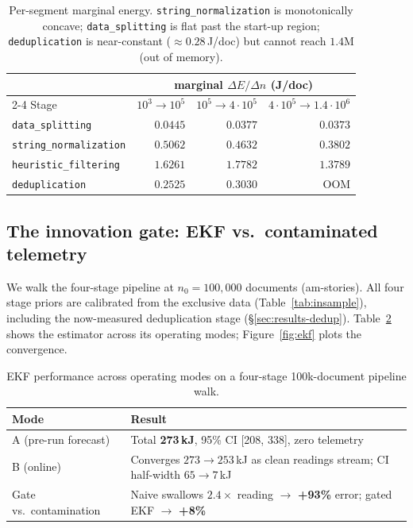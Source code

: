 \documentclass{article}
\begin{document}
\begin{table}[ht]
  \centering
  \begin{tabular}{lrrr}
    \toprule
    & \multicolumn{3}{c}{marginal $\Delta E/\Delta n$ (J/doc)} \\
    \cmidrule(lr){2-4}
    Stage & $10^3{\to}10^5$ & $10^5{\to}4{\cdot}10^5$ & $4{\cdot}10^5{\to}1.4{\cdot}10^6$ \\
    \midrule
    \texttt{data\_splitting}        & $0.0445$ & $0.0377$ & $0.0373$ \\
    \texttt{string\_normalization}  & $0.5062$ & $0.4632$ & $0.3802$ \\
    \texttt{heuristic\_filtering}   & $1.6261$ & $1.7782$ & $1.3789$ \\
    \texttt{deduplication}          & $0.2525$ & $0.3030$ & OOM \\
    \bottomrule
  \end{tabular}
  \caption{Per-segment marginal energy. \texttt{string\_normalization} is monotonically concave; \texttt{data\_splitting} is flat past the start-up region; \texttt{deduplication} is near-constant ($\approx 0.28$\,J/doc) but cannot reach $1.4$M (out of memory).}
  \label{tab:marginal}
\end{table}

\subsection{The innovation gate: EKF vs.\ contaminated telemetry}

\label{sec:results-ekf}

We walk the four-stage pipeline at $n_0 = 100{,}000$ documents (am-stories). All four stage priors are calibrated from the exclusive data (Table~\ref{tab:insample}), including the now-measured deduplication stage (\S\ref{sec:results-dedup}). Table~\ref{tab:ekf} shows the estimator across its operating modes; Figure~\ref{fig:ekf} plots the convergence.

\begin{table}[ht]
  \centering
  \begin{tabular}{ll}
    \toprule
    Mode & Result \\
    \midrule
    A (pre-run forecast)  & Total \textbf{273\,kJ}, 95\% CI [208, 338], zero telemetry \\
    B (online)            & Converges $273 \to 253$\,kJ as clean readings stream; CI half-width $65 \to 7$\,kJ \\
    Gate vs.\ contamination & Naive swallows $2.4\times$ reading $\to$ \textbf{+93\%} error; gated EKF $\to$ \textbf{+8\%} \\
    \bottomrule
  \end{tabular}
  \caption{EKF performance across operating modes on a four-stage 100k-document pipeline walk.}
  \label{tab:ekf}
\end{table}
\end{document}
